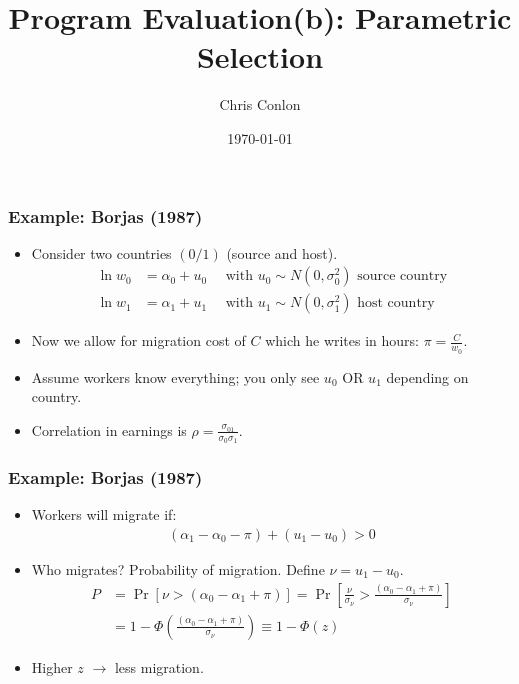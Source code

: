 \documentclass[xcolor=pdftex,dvipsnames,table,mathserif,aspectratio=169]{beamer}
\begin{document}
\title{Program Evaluation(b):
Parametric Selection}
\author{Chris Conlon}
\date{\today}

\frame{\titlepage}

\begin{frame}
\frametitle{Example: Borjas (1987)}
\begin{itemize}
\item Consider two countries $(0/1)$ (source and host).
\begin{align*}
\ln w_0 &= \alpha_0 + u_0 \quad \mbox{ with } u_0 \sim N(0,\sigma_0^2) \mbox{ source country}\\
\ln w_1 &= \alpha_1 + u_1 \quad \mbox{ with } u_1 \sim N(0,\sigma_1^2) \mbox{ host country}
\end{align*}
\item Now we allow for migration cost of $C$ which he writes in hours: $\pi = \frac{C}{w_0}$.
\item Assume workers know everything; you only see $u_0$ \alert{OR} $u_1$ depending on country.
\item Correlation in earnings is $\rho=\frac{\sigma_{01}}{\sigma_{0} \sigma_{1}}$.
\end{itemize}
\end{frame}

\begin{frame}
\frametitle{Example: Borjas (1987)}
\begin{itemize}
\item Workers will migrate if:
\begin{align*}
\left( \alpha_{1}-\alpha_{0}-\pi\right)+\left(u_{1}-u_{0}\right)>0
\end{align*}
\item Who migrates? Probability of migration. Define $\nu = u_1-u_0$.
\begin{align*}
P &=\operatorname{Pr}\left[\nu>\left(\alpha_{0}-\alpha_{1}+\pi\right)\right] =\operatorname{Pr}\left[\frac{\nu}{\sigma_{\nu}}>\frac{\left(\alpha_{0}-\alpha_{1}+\pi\right)}{\sigma_{\nu}}\right] \\
&=1-\Phi\left(\frac{\left(\alpha_{0}-\alpha_{1}+\pi\right)}{\sigma_{\nu}}\right) \equiv 1-\Phi(z)
\end{align*}
\item Higher $z$ $\rightarrow$ less migration.
\end{itemize}
\end{frame}
\end{document}
